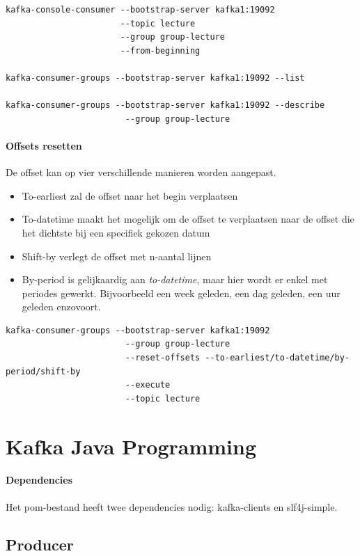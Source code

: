 \documentclass[a4paper,10pt,twoside]{report}
\begin{document}
\begin{lstlisting}[language=CLI-kafka]
kafka-console-consumer --bootstrap-server kafka1:19092
					   --topic lecture
					   --group group-lecture
					   --from-beginning
					   
kafka-consumer-groups --bootstrap-server kafka1:19092 --list

kafka-consumer-groups --bootstrap-server kafka1:19092 --describe
						--group group-lecture
\end{lstlisting}

\subsubsection{Offsets resetten}

De offset kan op vier verschillende manieren worden aangepast.

\begin{itemize}
	\item To-earliest zal de offset naar het begin verplaatsen
	\item To-datetime maakt het mogelijk om de offset te verplaatsen naar de offset die het dichtste bij een specifiek gekozen datum 
	\item Shift-by verlegt de offset met n-aantal lijnen
	\item By-period is gelijkaardig aan \textit{to-datetime}, maar hier wordt er enkel met periodes gewerkt. Bijvoorbeeld een week geleden, een dag geleden, een uur geleden enzovoort.
\end{itemize}

\begin{lstlisting}[language=CLI-kafka]
kafka-consumer-groups --bootstrap-server kafka1:19092
						--group group-lecture
						--reset-offsets --to-earliest/to-datetime/by-period/shift-by
						--execute
						--topic lecture
\end{lstlisting}

\chapter{Kafka Java Programming}

\subsubsection{Dependencies}

Het pom-bestand heeft twee dependencies nodig: kafka-clients en slf4j-simple.

\section{Producer}
\end{document}
